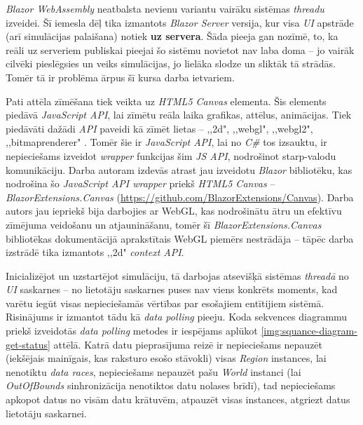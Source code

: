 \emph{Blazor WebAssembly} neatbalsta nevienu variantu vairāku
sistēmas \emph{threadu} izveidei. Šī iemesla dēļ tika izmantots \emph{Blazor Server}
versija, kur visa \emph{UI} apstrāde (arī simulācijas palaišana) notiek \textbf{uz servera}. Šāda
pieeja gan nozīmē, to, ka reāli uz serveriem publiskai pieejai šo sistēmu novietot nav laba doma -- jo
vairāk cilvēki pieslēgsies un veiks simulācijas, jo lielāka slodze un sliktāk tā strādās.
Tomēr tā ir problēma ārpus šī kursa darba ietvariem.

Pati attēla zīmēšana tiek veikta uz \emph{HTML5 Canvas} elementa\cite{html5:canvas}.
Šis elements piedāvā \emph{JavaScript API}, lai zīmētu reāla laika grafikas, attēlus, animācijas.
Tiek piedāvāti dažādi \emph{API} paveidi kā zīmēt lietas -- ,,2d", ,,webgl", ,,webgl2",
,,bitmaprenderer" \cite{html5:canvas-contexts}. Tomēr šie ir \emph{JavaScript API}, lai
no \emph{C\#} tos izsauktu, ir nepieciešams izveidot \emph{wrapper} funkcijas šim \emph{JS API},
nodrošinot starp-valodu komunikāciju. Darba autoram izdevās atrast jau izveidotu \emph{Blazor} bibliotēku,
kas nodrošina šo \emph{JavaScript API wrapper} priekš  \emph{HTML5 Canvas} -- \emph{BlazorExtensions.Canvas}
(\url{https://github.com/BlazorExtensions/Canvas}).
Darba autors jau iepriekš bija darbojies ar WebGL, kas nodrošinātu ātru un efektīvu
zīmējuma veidošanu un atjaunināšanu, tomēr šī \emph{BlazorExtensions.Canvas} bibliotēkas
dokumentācijā aprakstītais WebGL piemērs nestrādāja -- tāpēc darba izstrādē tika
izmantots ,,2d" \emph{context API}.

Inicializējot un uzstartējot simulāciju, tā darbojas atsevišķā
sistēmas \emph{threadā} no \emph{UI} saskarnes -- no lietotāju saskarnes puses nav
viens konkrēts moments, kad
varētu iegūt visas nepieciešamās vērtības par esošajiem entītijiem sistēmā. Risinājums
ir izmantot tādu kā \emph{data polling}\cite{progr:data-polling} pieeju. Koda sekvences
diagrammu priekš izveidotās \emph{data polling} metodes ir iespējams aplūkot \ref{img:squance-diagram-get-status} attēlā. Katrā
datu pieprasījuma reizē ir nepieciešams nepauzēt (iekšējais mainīgais, kas raksturo esošo stāvokli) visas \emph{Region} instances,
lai nenotiktu \emph{data races}, nepieciešams nepauzēt pašu \emph{World} instanci (lai
\emph{OutOfBounds} sinhronizācija nenotiktos datu nolases brīdī), tad nepieciešams apkopot
datus no visām datu krātuvēm, atpauzēt visas instances, atgriezt datus lietotāju saskarnei.

